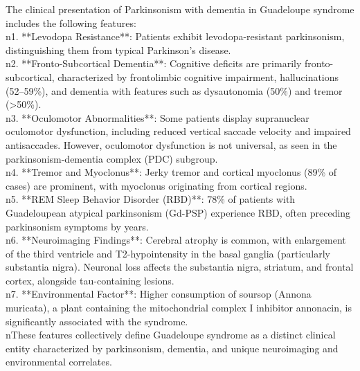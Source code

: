 \documentclass[10pt, a4paper, logo]{googledeepmind} %
\begin{document}
\begin{tcolorbox}[
    enhanced,
    breakable,
    colback=promptpurple,            %
    colframe=bordergray,           %
    boxrule=1pt,                   %
    sharp corners,                 %
]
\begin{flushleft}
The clinical presentation of Parkinsonism with dementia in Guadeloupe syndrome includes the following features:  \\n1. **Levodopa Resistance**: Patients exhibit levodopa-resistant parkinsonism, distinguishing them from typical Parkinson's disease.  \\n2. **Fronto-Subcortical Dementia**: Cognitive deficits are primarily fronto-subcortical, characterized by frontolimbic cognitive impairment, hallucinations (52–59\%), and dementia with features such as dysautonomia (50\%) and tremor (>50\%).  \\n3. **Oculomotor Abnormalities**: Some patients display supranuclear oculomotor dysfunction, including reduced vertical saccade velocity and impaired antisaccades. However, oculomotor dysfunction is not universal, as seen in the parkinsonism-dementia complex (PDC) subgroup.  \\n4. **Tremor and Myoclonus**: Jerky tremor and cortical myoclonus (89\% of cases) are prominent, with myoclonus originating from cortical regions.  \\n5. **REM Sleep Behavior Disorder (RBD)**: 78\% of patients with Guadeloupean atypical parkinsonism (Gd-PSP) experience RBD, often preceding parkinsonism symptoms by years.  \\n6. **Neuroimaging Findings**: Cerebral atrophy is common, with enlargement of the third ventricle and T2-hypointensity in the basal ganglia (particularly substantia nigra). Neuronal loss affects the substantia nigra, striatum, and frontal cortex, alongside tau-containing lesions.  \\n7. **Environmental Factor**: Higher consumption of soursop (Annona muricata), a plant containing the mitochondrial complex I inhibitor annonacin, is significantly associated with the syndrome.  \\nThese features collectively define Guadeloupe syndrome as a distinct clinical entity characterized by parkinsonism, dementia, and unique neuroimaging and environmental correlates.
\end{flushleft}
\end{tcolorbox}
\end{document}
